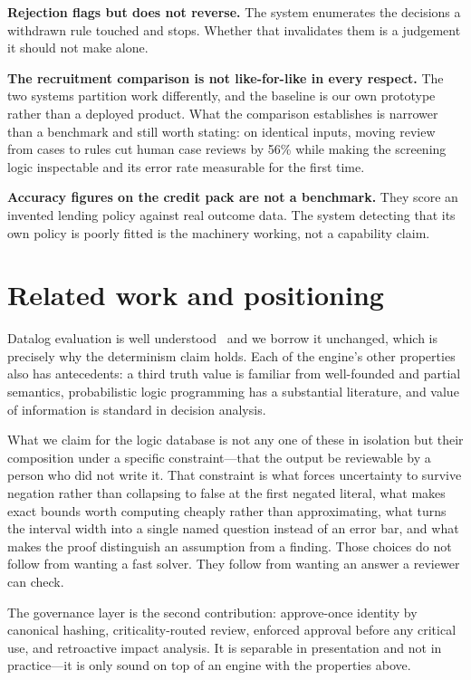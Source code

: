 \documentclass[sigconf,nonacm]{acmart}
\begin{document}
\textbf{Rejection flags but does not reverse.} The system enumerates the
decisions a withdrawn rule touched and stops. Whether that invalidates them is a
judgement it should not make alone.

\textbf{The recruitment comparison is not like-for-like in every respect.}
The two systems partition work differently, and the baseline is our own
prototype rather than a deployed product. What the comparison establishes is
narrower than a benchmark and still worth stating: on identical inputs, moving
review from cases to rules cut human case reviews by 56\% while making the
screening logic inspectable and its error rate measurable for the first time.

\textbf{Accuracy figures on the credit pack are not a benchmark.} They score an
invented lending policy against real outcome data. The system detecting that its
own policy is poorly fitted is the machinery working, not a capability claim.

\section{Related work and positioning}

Datalog evaluation is well understood~\cite{ceri1989} and we borrow it
unchanged, which is precisely why the determinism claim holds. Each of the
engine's other properties also has antecedents: a third truth value is familiar
from well-founded and partial semantics, probabilistic logic programming has a
substantial literature, and value of information is standard in decision
analysis.

What we claim for the logic database is not any one of these in isolation but
their composition under a specific constraint---that the output be reviewable by
a person who did not write it. That constraint is what forces uncertainty to
survive negation rather than collapsing to false at the first negated literal,
what makes exact bounds worth computing cheaply rather than approximating, what
turns the interval width into a single named question instead of an error bar,
and what makes the proof distinguish an assumption from a finding. Those choices
do not follow from wanting a fast solver. They follow from wanting an answer a
reviewer can check.

The governance layer is the second contribution: approve-once identity by
canonical hashing, criticality-routed review, enforced approval before any
critical use, and retroactive impact analysis. It is separable in presentation and not in
practice---it is only sound on top of an engine with the properties above.
\end{document}
